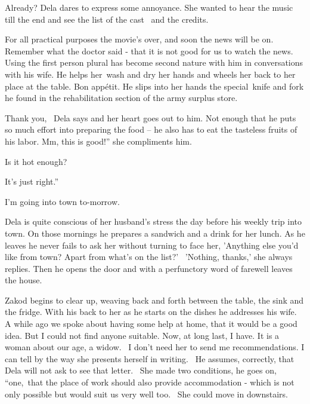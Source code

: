 \documentclass[12pt]{book}
\begin{document}
{\textquotedbl}Already?{\textquotedbl} Dela dares to express some annoyance. She wanted to hear the music till the end
and see the list of the cast \ and the credits.

{\textquotedbl}For all practical purposes the movie's over, and soon the news will be on. Remember what the doctor said
- that it is not good for us to watch the news.{\textquotedbl} Using the first person plural has become second nature
with him in conversations with his wife. He helps her~wash and dry her hands and wheels her back to her place at the
table. {\textquotedbl}Bon app\'etit.{\textquotedbl} He slips into her hands the special~knife and fork he found in the
rehabilitation section of the army surplus store.

{\textquotedbl}Thank you,{\textquotedbl}~ Dela says and her heart goes out to him. Not enough that he puts so much
effort into preparing the food -- he also has to eat the tasteless fruits of his labor. {\textquotedbl}Mm, this is
good!'' she compliments him.

{\textquotedbl}Is it hot enough?{\textquotedbl}

{\textquotedbl}It's just right.''

{\textquotedbl}I'm going into town to-morrow{\textquotedbl}.

Dela is quite conscious of her husband's stress the day before his weekly trip into town. On those mornings he prepares
a sandwich and a drink for her lunch. As he leaves he never fails to ask her without turning to face her, 'Anything
else you'd like from town? Apart from what's on the list?' \ {}'Nothing, thanks,' she always replies. Then he opens the
door and with a perfunctory word of farewell leaves the house.

Zakod begins to clear up, weaving back and forth between the table, the sink and the fridge. With his back to her as he
starts on the dishes he addresses his wife. {\textquotedbl}A while ago we spoke about having some help at home, that it
would be a good idea. But I could not find anyone suitable. Now, at long last, I have. It is a woman about our age, a
widow.~ I don't need her to send me recommendations. I can tell by the way she presents herself in
writing.{\textquotedbl} \ He assumes, correctly, that Dela will not ask to see that letter. \ {\textquotedbl}She made
two conditions,{\textquotedbl} he goes on, ``one,~that the place of work should also provide accommodation - which is
not only possible but would suit us very well too.~ She could move in downstairs.{\textquotedbl}
\end{document}
